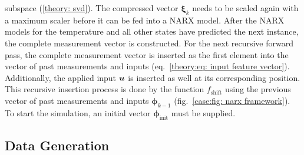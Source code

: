 subspace (\ref{theory: svd}). The compressed vector $\bm{\xi}_k$ needs to be scaled again with a maximum scaler before
it can be fed into a NARX model. After the NARX models for the temperature and all other states have predicted the 
next instance, the complete measurement vector is constructed. For the next recursive forward pass, the complete
measurement vector is inserted as the first element into the vector of past measurements and inputs (eq.~\ref{theory:eq: input feature vector}).
Additionally, the applied input ${\bm{u}}$ is inserted as well at its corresponding position. This recursive insertion process
is done by the function $f_\text{shift}$ using the previous vector of past measurements and inputs $\bm{\phi}_{k-1}$ (fig.~\ref{case:fig: narx framework}).
To start the simulation, an initial vector $\bm{\phi}_\text{init}$ must be supplied.





\subsection{Data Generation}


